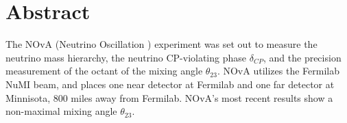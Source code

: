 \documentclass[12pt,letterpaper,oneside,openright]{book}
\begin{document}
\chapter*{\centering Abstract}
\begin{sloppypar}
The NOvA (Neutrino Oscillation ) experiment was set out to measure the neutrino mass hierarchy, the neutrino CP-violating phase $\delta_{CP}$, and the precision measurement of the octant of the mixing angle $\theta_{23}$. NOvA utilizes the Fermilab NuMI beam, and places one near detector at Fermilab and one far detector at Minnisota, 800 miles away from Fermilab. NOvA's most recent results show a non-maximal mixing angle $\theta_{23}$. 
\end{sloppypar}
\end{document}
